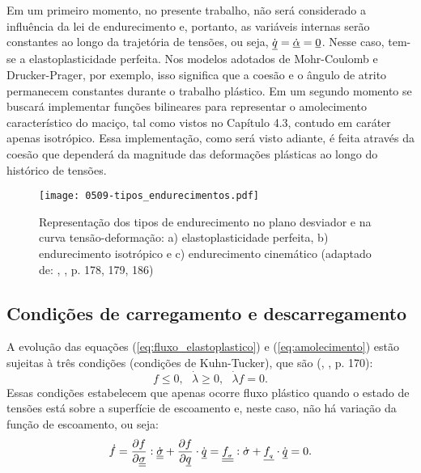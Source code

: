 Em um primeiro momento, no presente trabalho, não será considerado a influência da lei de endurecimento e, portanto, as variáveis internas serão constantes ao longo da trajetória de tensões, ou seja, $\dot {\underline q} = \dot {\underline \alpha} = \underline 0$. Nesse caso, tem-se a elastoplasticidade perfeita. Nos modelos adotados de Mohr-Coulomb e Drucker-Prager, por exemplo, isso significa que a coesão e o ângulo de atrito permanecem constantes durante o trabalho plástico. Em um segundo momento se buscará implementar funções bilineares para representar o amolecimento característico do maciço, tal como vistos no Capítulo 4.3, contudo em caráter apenas isotrópico. Essa implementação, como será visto adiante, é feita através da coesão que dependerá da magnitude das deformações plásticas ao longo do histórico de tensões.
\begin{figure}[H]
	\begin{center}
		\texttt{[image: 0509-tipos\_endurecimentos.pdf]}
	\end{center}
	\caption{\label{tipos_endurecimento}Representação dos tipos de endurecimento no plano desviador e na curva tensão-deformação: a) elastoplasticidade perfeita, b) endurecimento isotrópico e c) endurecimento cinemático (adaptado de: \citeauthor{Neto2008}, \citeyear{Neto2008}, p. 178, 179, 186)}
\end{figure}


\subsection{Condições de carregamento e descarregamento}

A evolução das equações (\ref{eq:fluxo_elastoplastico}) e (\ref{eq:amolecimento}) estão sujeitas à três condições (condições de Kuhn-Tucker), que são (\citeauthor{Neto2008}, \citeyear{Neto2008}, p. 170):
\begin{equation}
	\label{eq:kuhntucker}
	f \le 0,~~~ \dot \lambda \ge 0, ~~~ \dot \lambda f = 0.
\end{equation}
Essas condições estabelecem que apenas ocorre fluxo plástico quando o estado de tensões está sobre a superfície de escoamento e, neste caso, não há variação da função de escoamento, ou seja:
\begin{equation}
	\label{eq:consistencia}
	\dot f = \dfrac{\partial f}{\partial \underline{\underline \sigma}}:\dot {\underline{\underline \sigma}} + \dfrac{\partial f}{\partial \underline q}\cdot \dot {\underline q} = \underline{\underline {f_{_\sigma}}}:\dot \sigma + \underline{f_{_q}} \cdot \dot {\underline q} = 0.
\end{equation}

